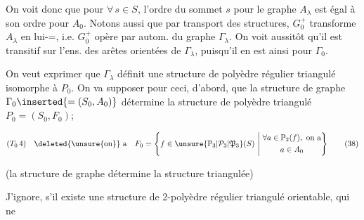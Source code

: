 
On voit donc que pour $\forall\,s\in S$, l'ordre du  sommet $s$ pour le graphe $A_\lambda$ est  égal à son ordre  pour $A_0$. Notons aussi que par transport des structures, $G_0^+$  transforme $A_\lambda$ en lui-=, i.e. $G_0^+$ opère par autom. du graphe $\Gamma_\lambda$.   On voit aussitôt qu'il est  transitif sur l'ens. des arêtes orientées de $\Gamma_\lambda$, puisqu'il en est ainsi pour $\Gamma_0$.

On veut exprimer que $\Gamma_\lambda$ définit une structure de polyèdre régulier triangulé isomorphe à $P_0$. On va supposer pour ceci, d'abord, que la structure de graphe $\Gamma_0\inserted{=(S_0,A_0)}$ détermine la structure de polyèdre triangulé $P_0=(S_0,F_0)$; 

\[
(T_0\,4)\quad \deleted{\unsure{\text{on}}}\ \text{a}\quad F_0=\left\{f\in\unsure{\mathbb P_3|\mathcal P_3|\mathfrak P_3}(S)\ \middle|\ 
 \begin{gathered}\forall a\in\mathbb P_2(f),\ \text{on a}\\a\in A_0\end{gathered}\right\}
\tag*{$(38)$}
\]


(la structure de graphe détermine la structure triangulée)

J'ignore, s'il existe une structure de 2-polyèdre régulier  triangulé orientable, qui ne
